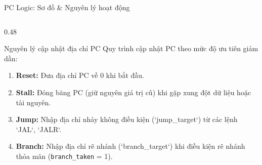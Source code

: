 \begin{frame}[fragile]{PC Logic: Sơ đồ \& Nguyên lý hoạt động}
\begin{columns}
        \begin{column}{0.48\textwidth}
            \begin{block}{Nguyên lý cập nhật địa chỉ PC}
                \scriptsize
                Quy trình cập nhật PC theo mức độ ưu tiên giảm dần:
                \begin{enumerate}
                    \item \textbf{Reset:} Đưa địa chỉ PC về 0 khi bắt đầu.
                    \item \textbf{Stall:} Đóng băng PC (giữ nguyên giá trị cũ) khi gặp xung đột dữ liệu hoặc tài nguyên.
                    \item \textbf{Jump:} Nhập địa chỉ nhảy không điều kiện (`jump\_target`) từ các lệnh `JAL`, `JALR`.
                    \item \textbf{Branch:} Nhập địa chỉ rẽ nhánh (`branch\_target`) khi điều kiện rẽ nhánh thỏa mãn (\texttt{branch\_taken} = 1).
                \end{enumerate}
            \end{block}
        \end{column}
    \end{columns}
\end{frame}


